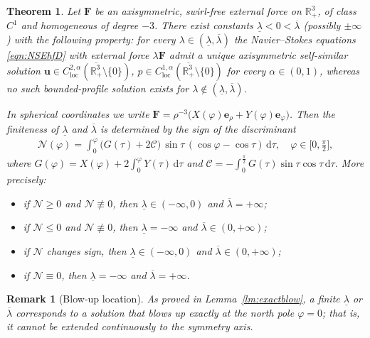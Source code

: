 \documentclass{amsart}
\newtheorem{theorem}{Theorem}[section]
\newtheorem{remark}{Remark}[section]
\newcommand{\vp}{\varphi}
\newcommand{\Bu}{{\boldsymbol{u}}}
\newcommand{\Be}{{\boldsymbol{e}}}
\newcommand{\BF}{{\boldsymbol{F}}}
\newcommand{\rmd}{\mathrm{d}}
\begin{document}
\begin{theorem}
\label{thm:B}
Let $\BF$ be an axisymmetric, swirl-free external force on $\mathbb{R}^{3}_{+}$, of class $C^{1}$ and homogeneous of degree $-3$.
There exist constants $\underline{\lambda}<0<\overline{\lambda}$ (possibly $\pm\infty$) with the following property: for every $\lambda\in(\underline{\lambda},\overline{\lambda})$ the Navier--Stokes equations \eqref{eqn:NSEhfD} with external force $\lambda\BF$ admit a unique axisymmetric self-similar solution
$\Bu\in C^{2,\alpha}_{\mathrm{loc}}(\overline{\mathbb R^3_+}\setminus\{0\})$, $p\in C^{1,\alpha}_{\mathrm{loc}}(\overline{\mathbb R^3_+}\setminus\{0\})$ for every $\alpha\in(0,1)$, whereas no such bounded-profile solution exists for $\lambda\notin(\underline{\lambda},\overline{\lambda})$.

In spherical coordinates we write $\BF = \rho^{-3}\bigl( X(\varphi)\Be_{\rho} + Y(\varphi)\Be_{\varphi} \bigr)$.
Then the finiteness of $\underline{\lambda}$ and $\overline{\lambda}$ is determined by the sign of the discriminant
\begin{align}\label{eqn:disfcn}
\mathcal{N}(\vp)=\int_{0}^{\vp}
\bigl(G(\tau)+2\mathcal{C}\bigr)\,\sin\tau\,(\cos\vp-\cos\tau)\,\rmd\tau,
\quad \vp \in \big[0,\tfrac{\pi}{2}\big],
\end{align}
where $G(\vp)=X(\vp)+2\int_{0}^{\vp} Y(\tau)\,\rmd\tau$ and $\mathcal{C}=-\int_{0}^{\frac{\pi}{2}}G(\tau)\sin\tau\cos\tau\,\rmd\tau$. More precisely:
\begin{itemize}
\item if $\mathcal{N}\ge0$ and $\mathcal{N}\not\equiv0$, then $\underline{\lambda}\in(-\infty,0)$ and $\overline{\lambda}=+\infty$;
\item if $\mathcal{N}\le0$ and $\mathcal{N}\not\equiv0$, then $\underline{\lambda}=-\infty$ and $\overline{\lambda}\in(0,+\infty)$;
\item if $\mathcal{N}$ changes sign, then $\underline{\lambda}\in(-\infty,0)$ and $\overline{\lambda}\in(0,+\infty)$;
\item if $\mathcal{N}\equiv0$, then $\underline{\lambda}=-\infty$ and $\overline{\lambda}=+\infty$.
\end{itemize}
\end{theorem}


\begin{remark}[Blow-up location]
As proved in Lemma~\ref{lm:exactblow}, a finite $\underline{\lambda}$ or $\overline{\lambda}$ corresponds to a solution that blows up exactly at the north pole $\varphi=0$; that is, it cannot be extended continuously to the symmetry axis.
\end{remark}
\end{document}
